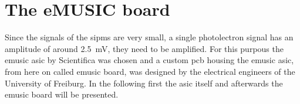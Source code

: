 

\section{The eMUSIC board}
Since the signals of the \acp{sipm} are very small, a single photolectron signal has an amplitude of around \SI{2.5}{\milli\volt}, they need to be amplified.
For this purpous the \ac{emusic} \ac{asic} by Scientifica was chosen and a custom \ac{pcb} housing the \ac{emusic} \ac{asic}, from here on called \ac{emusic} board, was designed by the electrical engineers of the University of Freiburg.
In the following first the \ac{asic} itself and afterwards the \ac{emusic} board will be presented.

